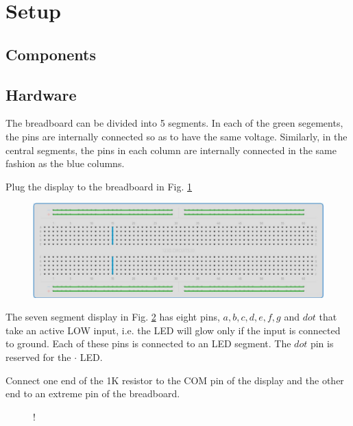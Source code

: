 \documentclass[journal,12pt,twocolumn]{IEEEtran}
\begin{document}
\section{Setup}
\subsection{Components}

%
\subsection{Hardware}
The breadboard can be divided into 5 segments.  In each of the green segements, the pins are internally connected so as to have the same voltage.  Similarly, in the central segments, the pins in each column  are internally connected in the same fashion as the blue columns. 

\begin{problem}
	Plug the display to the breadboard in Fig. \ref{fig:breadboard}
\end{problem}
\begin{figure}[!h]
\begin{center}
\includegraphics[width=\columnwidth]{./figs/breadboard}
\end{center}
\caption{}
\label{fig:breadboard}
\end{figure}

The seven segment display in Fig. \ref{fig:sevenseg} has eight pins, $a, b, c, d, e, f, g$ and $dot$ that take an active LOW input, i.e.  the LED will glow only if the input is connected to ground.  Each of these pins is connected to an LED segment.  The $dot$ pin is  reserved for the $\cdot$ LED.  

%

\begin{problem}
	Connect one end of the 1K resistor to the COM pin of the display and the other end to an extreme pin of the breadboard.	
\end{problem}
%
%
\begin{figure}[!h]
\begin{center}
 {!} {

}
\end{center}
\caption{}
\label{fig:sevenseg}
\end{figure}
\end{document}
